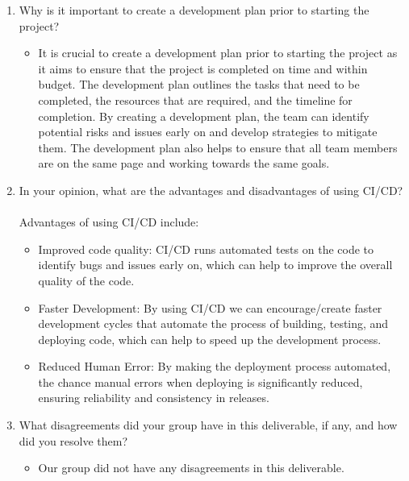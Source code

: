 \documentclass{article}
\begin{document}
\begin{enumerate}
    \item Why is it important to create a development plan prior to starting the
    project?
    \begin{itemize}
        \item It is crucial to create a development plan prior to starting the project as it aims to ensure that the project is completed on time and within budget. The development plan outlines the tasks that need to be completed, the resources that are required, and the timeline for completion. By creating a development plan, the team can identify potential risks and issues early on and develop strategies to mitigate them. The development plan also helps to ensure that all team members are on the same page and working towards the same goals.
    \end{itemize}
    \item In your opinion, what are the advantages and disadvantages of using
    CI/CD? \\ \\
        Advantages of using CI/CD include:
        \begin{itemize}
        \item Improved code quality: CI/CD runs automated tests on the code to identify bugs and issues early on, which can help to improve the overall quality of the code.
        \item Faster Development: By using CI/CD we can encourage/create faster development cycles that automate the process of building, testing, and deploying code, which can help to speed up the development process.
        \item Reduced Human Error: By making the deployment process automated, the chance manual errors when deploying is significantly reduced, ensuring reliability and consistency in releases.
        \end{itemize}
    \item What disagreements did your group have in this deliverable, if any,
    and how did you resolve them?
    \begin{itemize}
        \item Our group did not have any disagreements in this deliverable.
    \end{itemize}
\end{enumerate}

\newpage{}
\end{document}
